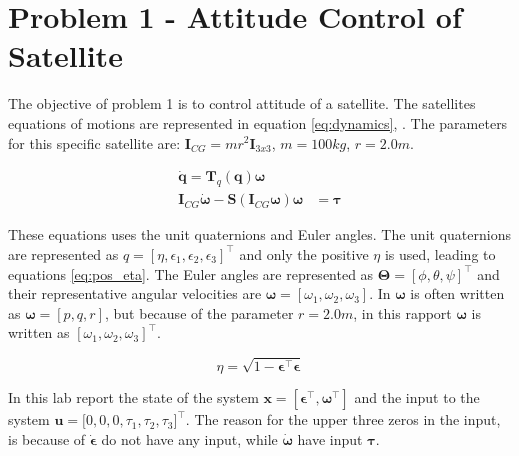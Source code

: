 \section*{Problem 1 - Attitude Control of Satellite}

The objective of problem 1 is to control attitude of a satellite. The satellites equations of motions are represented in equation \eqref{eq:dynamics},  \cite{Fossen2011}. The parameters for this specific satellite are: $\mathbf{I}_{CG} = mr^2 \mathbf{I}_{3x3}$, $m = 100 kg$, $r = 2.0 m$.  

\begin{subequations}
\label{eq:dynamics}
	\begin{align}
		\dot{\mathbf{q}} = \mathbf{T}_q (\mathbf{q} ) \boldsymbol{\omega} \\
		\mathbf{I}_{CG} \dot{\boldsymbol{\omega}} - \mathbf{S} (\mathbf{I}_{CG} \boldsymbol{\omega} ) \boldsymbol{\omega} & =  \boldsymbol{\tau} 
		\label{eq:EOM_omega_dot}
	\end{align}	
\end{subequations}

These equations uses the unit quaternions and Euler angles. The unit  quaternions are represented as $q = [\eta, \epsilon_1, \epsilon_2, \epsilon_3]^\top$ and only the positive $\eta$ is used, leading to equations \eqref{eq:pos_eta}. The Euler angles are represented as $\boldsymbol{\Theta} = [\phi , \theta , \psi]^\top$ and their representative angular velocities are  $\boldsymbol{\omega} = [\omega_1, \omega_2, \omega_3]$. In \cite{Fossen2011} $\boldsymbol{\omega}$ is often written as $\boldsymbol{\omega} = [p,q,r]$, but because of the parameter $r = 2.0m$, in this rapport $\boldsymbol{\omega}$ is written as $[\omega_1, \omega_2, \omega_3]^\top$.

\begin{equation}
    \eta = \sqrt{1 - \boldsymbol{\epsilon}^\top \boldsymbol{\epsilon}} 
    \label{eq:pos_eta}
\end{equation}
 
In this lab report the state of the system $\boldsymbol{x} = [ \boldsymbol{\epsilon}^\top, \boldsymbol{\omega}^\top]$ and the input to the system $\mathbf{u} = \boldsymbol[0,0,0,\tau_1, \tau_2, \tau_3]^\top$. The reason for the upper three zeros in the input, is because of $\dot{\boldsymbol{\epsilon}}$ do not have any input, while $\dot{\boldsymbol{\omega}}$ have input $\boldsymbol{\tau}$.

